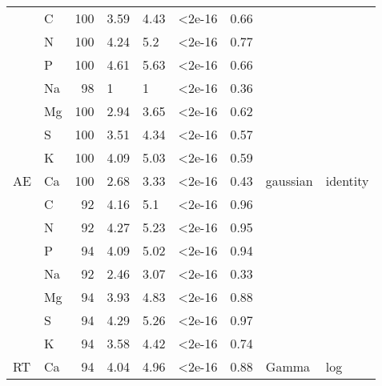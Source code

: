 \begin{table}[H]
{\begin{tabular}[t]{llrllllll}
\cmidrule{1-7}
 & C & 100 & 3.59 & 4.43 & <2e-16 & 0.66 &  & \\
\cmidrule{2-7}
 & N & 100 & 4.24 & 5.2 & <2e-16 & 0.77 &  & \\
\cmidrule{2-7}
 & P & 100 & 4.61 & 5.63 & <2e-16 & 0.66 &  & \\
\cmidrule{2-7}
 & Na & 98 & 1 & 1 & <2e-16 & 0.36 &  & \\
\cmidrule{2-7}
 & Mg & 100 & 2.94 & 3.65 & <2e-16 & 0.62 &  & \\
\cmidrule{2-7}
 & S & 100 & 3.51 & 4.34 & <2e-16 & 0.57 &  & \\
\cmidrule{2-7}
 & K & 100 & 4.09 & 5.03 & <2e-16 & 0.59 &  & \\
\cmidrule{2-7}
\multirow{-8}{*}{\raggedright\arraybackslash AE} & Ca & 100 & 2.68 & 3.33 & <2e-16 & 0.43 & \multirow{-24}{*}{\raggedright\arraybackslash gaussian} & \multirow{-24}{*}{\raggedright\arraybackslash identity}\\
\cmidrule{1-9}
 & C & 92 & 4.16 & 5.1 & <2e-16 & 0.96 &  & \\
\cmidrule{2-7}
 & N & 92 & 4.27 & 5.23 & <2e-16 & 0.95 &  & \\
\cmidrule{2-7}
 & P & 94 & 4.09 & 5.02 & <2e-16 & 0.94 &  & \\
\cmidrule{2-7}
 & Na & 92 & 2.46 & 3.07 & <2e-16 & 0.33 &  & \\
\cmidrule{2-7}
 & Mg & 94 & 3.93 & 4.83 & <2e-16 & 0.88 &  & \\
\cmidrule{2-7}
 & S & 94 & 4.29 & 5.26 & <2e-16 & 0.97 &  & \\
\cmidrule{2-7}
 & K & 94 & 3.58 & 4.42 & <2e-16 & 0.74 &  & \\
\cmidrule{2-7}
\multirow{-8}{*}{\raggedright\arraybackslash RT} & Ca & 94 & 4.04 & 4.96 & <2e-16 & 0.88 & \multirow{-8}{*}{\raggedright\arraybackslash Gamma} & \multirow{-8}{*}{\raggedright\arraybackslash log}\\
\bottomrule
\end{tabular}}
\end{table}
